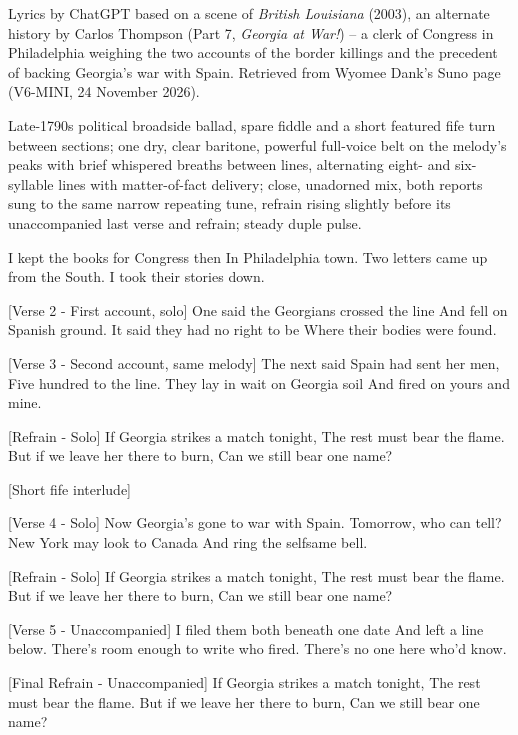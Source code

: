 \begin{notes}
Lyrics by ChatGPT based on a scene of \emph{British Louisiana} (2003), an alternate history by Carlos Thompson (Part 7, \emph{Georgia at War!}) -- a clerk of Congress in Philadelphia weighing the two accounts of the border killings and the precedent of backing Georgia's war with Spain. Retrieved from Wyomee Dank's Suno page (V6-MINI, 24 November 2026).
\end{notes}
\begin{style}
Late-1790s political broadside ballad, spare fiddle and a short featured fife turn between sections; one dry, clear baritone, powerful full-voice belt on the melody’s peaks with brief whispered breaths between lines, alternating eight- and six-syllable lines with matter-of-fact delivery; close, unadorned mix, both reports sung to the same narrow repeating tune, refrain rising slightly before its unaccompanied last verse and refrain; steady duple pulse.
\end{style}
\begin{lyrics}
I kept the books for Congress then
In Philadelphia town.
Two letters came up from the South.
I took their stories down.

[Verse 2 - First account, solo]
One said the Georgians crossed the line
And fell on Spanish ground.
It said they had no right to be
Where their bodies were found.

[Verse 3 - Second account, same melody]
The next said Spain had sent her men,
Five hundred to the line.
They lay in wait on Georgia soil
And fired on yours and mine.

[Refrain - Solo]
If Georgia strikes a match tonight,
The rest must bear the flame.
But if we leave her there to burn,
Can we still bear one name?

[Short fife interlude]

[Verse 4 - Solo]
Now Georgia’s gone to war with Spain.
Tomorrow, who can tell?
New York may look to Canada
And ring the selfsame bell.

[Refrain - Solo]
If Georgia strikes a match tonight,
The rest must bear the flame.
But if we leave her there to burn,
Can we still bear one name?

[Verse 5 - Unaccompanied]
I filed them both beneath one date
And left a line below.
There’s room enough to write who fired.
There’s no one here who’d know.

[Final Refrain - Unaccompanied]
If Georgia strikes a match tonight,
The rest must bear the flame.
But if we leave her there to burn,
Can we still bear one name?
\end{lyrics}

